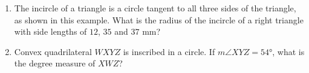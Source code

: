 \documentclass{article}
\begin{document}
\begin{multicols}{2}
\begin{enumerate}
\begin{center}
            \end{center}
            \vspace{3cm}
        \item The incircle of a triangle is a circle tangent to all three sides of the triangle, as shown in this example.
            What is the radius of the incircle of a right triangle with side lengths of $12$, $35$ and $37$ mm?
            \begin{center}
            \end{center}
            \vspace{3cm}
        \item Convex quadrilateral $WXYZ$ is inscribed in a circle.
            If $m\angle XYZ = \ang{54}$, what is the degree measure of $XWZ$?
            \vspace{3cm}
    \end{enumerate}
\end{multicols}
\end{document}
